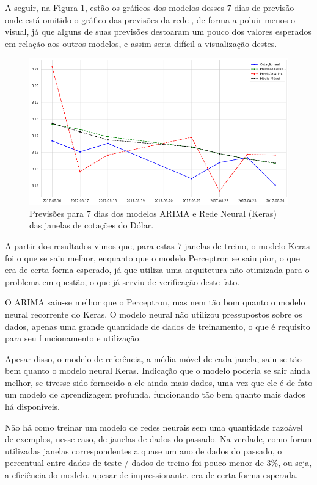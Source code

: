 A seguir, na Figura \ref{fig:previsoes_1}, estão os gráficos dos modelos desses $7$ dias de previsão onde está omitido o gráfico das previsões da rede , de forma a poluir menos o visual, já que alguns de suas previsões destoaram um pouco dos valores esperados em relação aos outros modelos, e assim seria difícil a visualização destes.

\begin{figure}[htb]
\centering
\includegraphics[width=13cm]{figuras/series_previsoes}
\caption{Previsões para $7$ dias dos modelos ARIMA e Rede Neural (Keras) das janelas de cotações do Dólar.}
\label{fig:previsoes_1}
\end{figure}

A partir dos resultados vimos que, para estas $7$ janelas de treino, o modelo Keras foi o que se saiu melhor, enquanto que o modelo Perceptron se saiu pior, o que era de certa forma esperado, já que utiliza uma arquitetura não otimizada para o problema em questão, o que já serviu de verificação deste fato.

O ARIMA saiu-se melhor que o Perceptron, mas nem tão bom quanto o modelo neural recorrente do Keras. O modelo neural não utilizou pressupostos sobre os dados, apenas uma grande quantidade de dados de treinamento, o que é requisito para seu funcionamento e utilização.

Apesar disso, o modelo de referência, a média-móvel de cada janela, saiu-se tão bem quanto o modelo neural Keras. Indicação que o modelo poderia se sair ainda melhor, se tivesse sido fornecido a ele ainda mais dados, uma vez que ele é de fato um modelo de aprendizagem profunda, funcionando tão bem quanto mais dados há disponíveis.

Não há como treinar um modelo de redes neurais sem uma quantidade razoável de exemplos, nesse caso, de janelas de dados do passado. Na verdade, como foram utilizadas janelas correspondentes a quase um ano de dados do passado, o percentual entre dados de teste $/$ dados de treino foi pouco menor de $3\%$, ou seja, a eficiência do modelo, apesar de impressionante, era de certa forma esperada.



